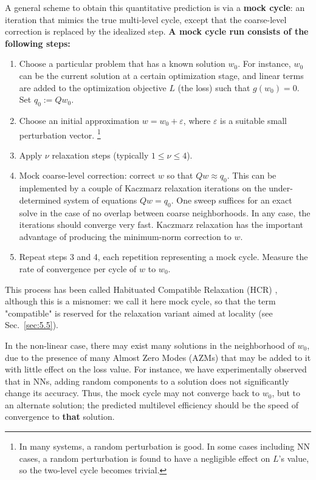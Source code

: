 \documentclass{article} %
\begin{document}
A general scheme to obtain this quantitative prediction is via a \textbf{mock cycle}: an iteration that mimics the true multi-level cycle, except that the coarse-level correction is replaced by the idealized step. {\bf A mock cycle run consists of the following steps:}
\begin{enumerate}
	\item Choose a particular problem that has a known solution $w_0$. For instance, $w_0$ can be the current solution at a certain optimization stage, and linear terms are added to the optimization objective $L$ (the loss) such that $g(w_0)=0$. Set $q_0 := Q w_0$.
	\item Choose an initial approximation $w = w_0 + \varepsilon$, where $\varepsilon$ is a suitable small perturbation vector. \footnote{In many systems, a random perturbation is good. In some cases including NN cases, a random perturbation is found to have a negligible effect on $L$'s value, so the two-level cycle becomes trivial.}
	\item Apply $\nu$ relaxation steps (typically $1 \leq \nu \leq 4$).
	\item Mock coarse-level correction: correct $w$ so that $Q w \approx q_0$. This can be implemented by a couple of Kaczmarz relaxation iterations \cite[Sec.~1.1]{guide} on the under-determined system of equations $Q w = q_0$. One sweep suffices for an exact solve in the case of no overlap between coarse neighborhoods. In any case, the iterations should converge very fast. Kaczmarz relaxation has the important advantage of producing the minimum-norm correction to $w$.
	\item Repeat steps 3 and 4, each repetition representing a mock cycle. Measure the rate of convergence per cycle of $w$ to $w_0$.
\end{enumerate}
This process has been called Habituated Compatible Relaxation (HCR) \cite[Sec.~14.3]{guide}, although this is a misnomer: we call it here mock cycle, so that the term "compatible" is reserved for the relaxation variant aimed at locality (see Sec.~\ref{sec:5.5}).

In the non-linear case, there may exist many solutions in the neighborhood of $w_0$, due to the presence of many Almost Zero Modes (AZMs) that may be added to it with little effect on the loss value. For instance, we have experimentally observed that in NNs, adding random components to a solution does not significantly change its accuracy. Thus, the mock cycle may not converge back to $w_0$, but to an alternate solution; the predicted multilevel efficiency should be the speed of convergence to \textbf{that} solution.
\end{document}

